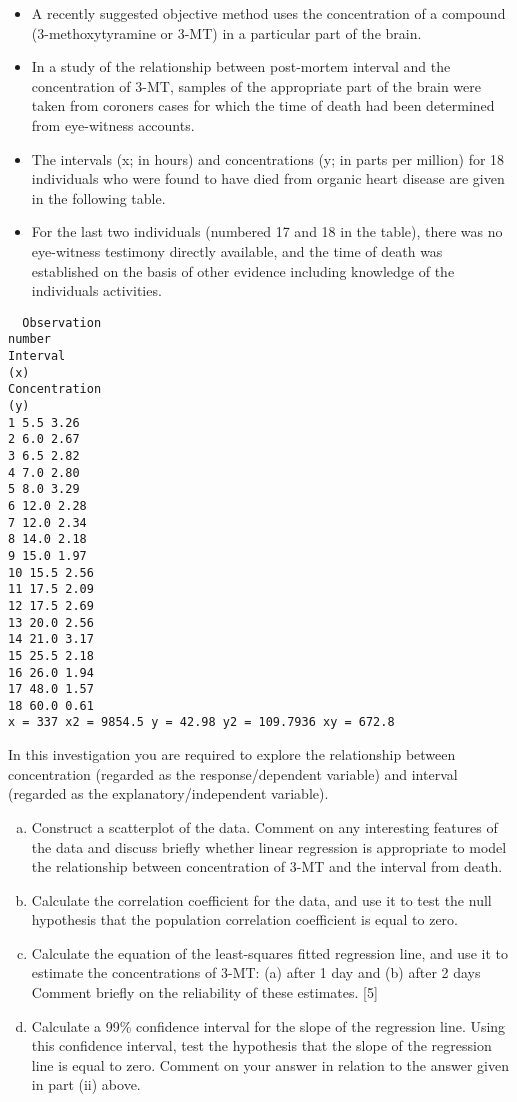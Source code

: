 \documentclass[a4paper,12pt]{article}
\begin{document}
\begin{enumerate}
\begin{itemize}
\item 
A recently suggested objective method uses the concentration of a compound (3-methoxytyramine or 3-MT) in a particular part of the brain.
\item In a study of the relationship between post-mortem interval and the concentration of 3-MT, samples of the appropriate part of the brain were taken from coroners cases for which the time of death had been determined from eye-witness accounts. 
\item The
intervals (x; in hours) and concentrations (y; in parts per million) for 18 individuals who were found to have died from organic heart disease are given in the following table. 
\item For the last two individuals (numbered 17 and 18 in the table), there was no eye-witness testimony directly available, and the time of death was established on the
basis of other evidence including knowledge of the individuals activities.
\end{itemize}

\begin{verbatim}
  Observation
number
Interval
(x)
Concentration
(y)
1 5.5 3.26
2 6.0 2.67
3 6.5 2.82
4 7.0 2.80
5 8.0 3.29
6 12.0 2.28
7 12.0 2.34
8 14.0 2.18
9 15.0 1.97
10 15.5 2.56
11 17.5 2.09
12 17.5 2.69
13 20.0 2.56
14 21.0 3.17
15 25.5 2.18
16 26.0 1.94
17 48.0 1.57
18 60.0 0.61
x = 337 x2 = 9854.5 y = 42.98 y2 = 109.7936 xy = 672.8  
\end{verbatim}

In this investigation you are required to explore the relationship between
concentration (regarded as the response/dependent variable) and interval (regarded as the explanatory/independent variable).
\begin{enumerate}[(a)]
    \item  Construct a scatterplot of the data. Comment on any interesting features of the data and discuss briefly whether linear regression is appropriate to model the relationship between concentration of 3-MT and the interval from death.

    \item Calculate the correlation coefficient for the data, and use it to test the null
hypothesis that the population correlation coefficient is equal to zero.

    \item  Calculate the equation of the least-squares fitted regression line, and use it to
estimate the concentrations of 3-MT:
(a) after 1 day and
(b) after 2 days
Comment briefly on the reliability of these estimates. [5]
    \item Calculate a 99\% confidence interval for the slope of the regression line. Using this confidence interval, test the hypothesis that the slope of the regression line is equal to zero. Comment on your answer in relation to the answer given in
part (ii) above.
\end{enumerate}

\end{enumerate}
\newpage
\end{document}
